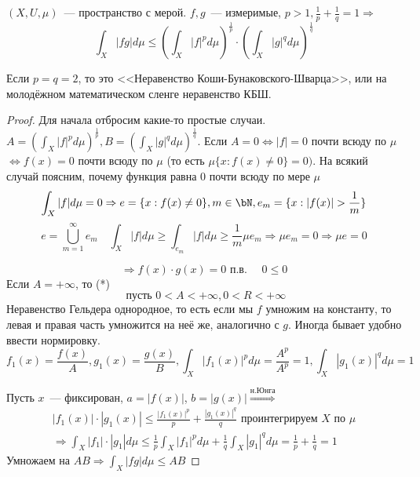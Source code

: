 \documentclass[document]{subfiles}
\begin{document}
\begin{theorem}
    $(X, U, \mu)$~--- пространство с мерой. $f, g$~--- измеримые, $p > 1, \frac{1}{p} + \frac{1}{q} = 1 \Rightarrow$
    \[ \int_X |fg| d\mu \leq \left( \int_X |f|^p d\mu \right)^{\frac{1}{p}} \cdot \left( \int_X |g|^q d\mu \right)^{\frac{1}{q}} \tag{*} \]
\end{theorem}
Если $p=q=2$, то это <<Неравенство Коши-Бунаковского-Шварца>>, или на молодёжном математическом сленге неравенство КБШ.

\begin{proof}
Для начала отбросим какие-то простые случаи. \\
$A = \left( \int_X |f|^p d \mu \right)^{\frac{1}{p}}, B = \left( \int_X |g|^q d \mu \right)^{\frac{1}{q}}$.
Если $A = 0 \Leftrightarrow |f| = 0$ почти всюду по $\mu$ $\Leftrightarrow f(x) = 0$ почти всюду по $\mu$ (то есть $\mu \{x: f(x) \ne 0 \} = 0)$.
На всякий случай поясним, почему функция равна 0 почти всюду по мере $\mu$
\[ \int_X |f| d \mu = 0 \Rightarrow e = \{x: f(x) \ne 0 \}, m \in \bN, e_m = \{x: |f(x)| > \frac{1}{m} \} \]
\[e = \bigcup^\infty_{m=1} e_m \quad \int_X |f| d \mu \geq \int_{e_m} |f| d\mu \geq \frac{1}{m} \mu e_m \Rightarrow \mu e_m = 0 \Rightarrow \mu e = 0 \]

\[ \Rightarrow f(x) \cdot g(x) = 0 \text { п.в. } \quad 0 \leq 0 \tag{*} \]
Если $A = +\infty$, то (*) 
\[ \text{ пусть } 0 < A < +\infty, 0 < R < +\infty \]
Неравенство Гельдера однородное, то есть если мы $f$ умножим на константу, то левая и правая часть умножится на неё же, аналогично с $g$. Иногда
бывает удобно ввести нормировку.
\[ f_1(x) = \frac{f(x)}{A}, g_1(x) = \frac{g(x)}{B}, \int_X |f_1(x)|^p d\mu = \frac{A^p}{A^p} = 1, \int_X |g_1(x)|^q d \mu = 1 \]

Пусть $x$~--- фиксирован, $a = |f(x)|$, $b = |g(x)| \stackrel{\text{н.Юнга}}{\Rightarrow}$ 
\begin{multline*}
    |f_1(x)| \cdot |g_1(x)| \leq \frac{|f_1(x)|^p}{p} + \frac{|g_1(x)|^q}{q} \text{ проинтегрируем } X \text { по } \mu \\
    \Rightarrow \int_X |f_1| \cdot |g_1| d \mu \leq \frac{1}{p} \int_X |f_1|^p d\mu + \frac{1}{q} \int_X |g_1|^q d\mu = \frac{1}{p} + \frac{1}{q} = 1
\end{multline*}
Умножаем на $AB \Rightarrow \int_X |fg| d \mu \leq AB $
\end{proof}
\end{document}
